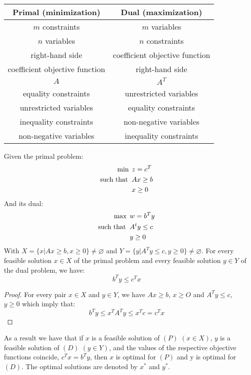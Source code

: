 \begin{table}[H]
    \centering
    \begin{tabular}{cc}
    \hline
    \textbf{Primal (minimization)} & \textbf{Dual (maximization)}   \\ \hline
    $m$ constraints                & $m$ variables                  \\
    $n$ variables                  & $n$ constraints                \\
    right-hand side                & coefficient objective function \\
    coefficient objective function & right-hand side                \\
    $A$                            & $A^T$                          \\
    equality constraints           & unrestricted variables         \\
    unrestricted variables         & equality constraints           \\
    inequality constraints         & non-negative variables         \\
    non-negative variables         & inequality constraints         \\ \hline
    \end{tabular}
\end{table}

\begin{theorem}
    Given the primal problem: 
    \begin{align*}
        \min                      \:&\: z=c^T            \\
        \textnormal{such that }     &\: Ax\geq b         \\
                                    &\: x \geq 0
    \end{align*}
    And its dual: 
    \begin{align*}
        \max                      \:&\: w=b^Ty              \\
        \textnormal{such that }     &\: A^ty\leq c          \\
                                    &\: y \geq 0
    \end{align*}
    With $X=\{x|Ax \geq b, x \geq 0\} \neq \varnothing$ and $Y=\{y|A^Ty \leq c, y \geq 0\} \neq \varnothing$.
    For every feasible solution $x \in X$ of the primal problem and every feasible solution $y \in Y$ of the dual problem, we have: 
    \[b^Ty \leq c^Tx\]
\end{theorem}
\begin{proof}
    For every pair $x \in X$ and $y \in Y$, we have $Ax \geq b$, $x \geq O$ and $A^Ty \leq c$, $y \geq 0$ which imply that: 
    \[b^Ty \leq x^TA^Ty \leq x^Tc=c^Tx\]
\end{proof}
As a result we have that if $x$ is a feasible solution of $(P)$ $(x \in X)$, $y$ is a feasible solution of $(D)$ $(y \in Y)$, and the values of the respective objective functions coincide, $c^Tx=b^Ty$, then $x$ is optimal for $(P)$ and y is optimal for $(D)$. 
The optimal solutions are denoted by $x^{*}$ and $y^{*}$. 

